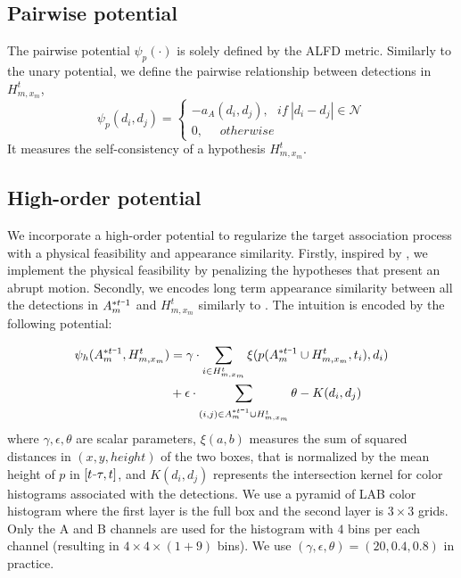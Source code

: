 \documentclass[10pt,twocolumn,letterpaper]{article}
\newcommand{\minus}{\scalebox{0.5}[1.0]{$-$}}
\begin{document}
\subsection{Pairwise potential}
\label{sec:pairwise}

The pairwise potential $\psi_p(\cdot)$ is solely defined by the ALFD metric. Similarly to the unary potential, we define the pairwise relationship between detections in $H_{m, x_m}^t$, 
{\footnotesize
\begin{equation}
\psi_p (d_i, d_j) = 
\left\{\begin{matrix}
-a_A(d_i, d_j),\ \ \ if\ |d_i-d_j| \in \mathcal{N}\\ 
0,\ \ \ \ \ \ otherwise
\end{matrix}\right.
\end{equation}}
It measures the self-consistency of a hypothesis $H_{m, x_m}^t$.

\subsection{High-order potential}
\label{sec:targethorder}
We incorporate a high-order potential to regularize the target association process with a physical feasibility and appearance similarity.
Firstly, inspired by \cite{Andriyenko:2012:DCO,ZamirECCV12}, we implement the physical feasibility by penalizing the hypotheses that present an abrupt motion. Secondly, we encodes long term appearance similarity between all the detections in $A_m^{* t\minus 1}$ and $H_{m, x_m}^t$ similarly to \cite{ZamirECCV12}. The intuition is encoded by the following potential:

{\scriptsize
\begin{align}
\psi_h  (A_m^{* t\minus 1}, H_{m, x_m}^t) &=  \gamma \cdot \sum_{i \in H_{m, x_m}^t} \xi(p(A_m^{* t\minus 1} \cup H_{m, x_m}^t, t_i), d_i) \nonumber \\
& + \epsilon \cdot \sum_{(i, j) \in A_m^{* t\minus 1} \cup H_{m, x_m}^t} \theta - K(d_i, d_j)
\end{align}}
where $\gamma, \epsilon, \theta$ are scalar parameters, $\xi(a, b)$ measures the sum of squared distances in $(x, y, height)$ of the two boxes, that is normalized by the mean height of $p$ in $[t\minus \tau, t]$, and $K(d_i, d_j)$ represents the intersection kernel for color histograms associated with the detections. We use a pyramid of LAB color histogram where the first layer is the full box and the second layer is $3 \times 3$ grids. Only the A and B channels are used for the histogram with $4$ bins per each channel (resulting in $4 \times 4 \times (1+9)$ bins). We use $(\gamma, \epsilon, \theta) = (20, 0.4, 0.8)$ in practice. 
\end{document}
